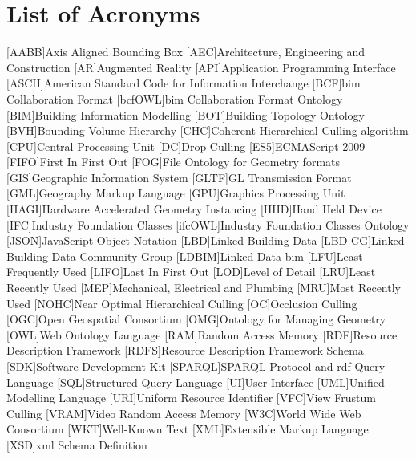 \documentclass[12pt,a4paper,faculty=ea,language=en,doctype=report]{settings/ugent-doc}
\begin{document}
\chapter*{List of Acronyms}
\begin{acronym}[JSONP]\itemsep2pt\hypersetup{hidelinks}
  [AABB]{Axis Aligned Bounding Box}
  [AEC]{Architecture, Engineering and Construction}
  [AR]{Augmented Reality}
  [API]{Application Programming Interface}
  [ASCII]{American Standard Code for Information Interchange}
  [BCF]{\acs{bim} Collaboration Format}
  [bcfOWL]{\acs{bim} Collaboration Format Ontology}
  [BIM]{Building Information Modelling}
  [BOT]{Building Topology Ontology}
  [BVH]{Bounding Volume Hierarchy}
  [CHC]{Coherent Hierarchical Culling algorithm}
  [CPU]{Central Processing Unit}
  [DC]{Drop Culling}
  [ES5]{ECMAScript 2009}
  [FIFO]{First In First Out}
  [FOG]{File Ontology for Geometry formats}
  [GIS]{Geographic Information System}
  [GLTF]{GL Transmission Format}
  [GML]{Geography Markup Language}
  [GPU]{Graphics Processing Unit}
  [HAGI]{Hardware Accelerated Geometry Instancing}
  [HHD]{Hand Held Device}
  [IFC]{Industry Foundation Classes}
  [ifcOWL]{Industry Foundation Classes Ontology}
  [JSON]{JavaScript Object Notation}
  [LBD]{Linked Building Data}
  [LBD-CG]{Linked Building Data Community Group}
  [LDBIM]{Linked Data \acs{bim}}
  [LFU]{Least Frequently Used}
  [LIFO]{Last In First Out}
  [LOD]{Level of Detail}
  [LRU]{Least Recently Used}
  [MEP]{Mechanical, Electrical and Plumbing}
  [MRU]{Most Recently Used}
  [NOHC]{Near Optimal Hierarchical Culling}
  [OC]{Occlusion Culling}
  [OGC]{Open Geospatial Consortium}
  [OMG]{Ontology for Managing Geometry}
  [OWL]{Web Ontology Language}
  [RAM]{Random Access Memory}
  [RDF]{Resource Description Framework}
  [RDFS]{Resource Description Framework Schema}
  [SDK]{Software Development Kit}
  [SPARQL]{SPARQL Protocol and \acs{rdf} Query Language}
  [SQL]{Structured Query Language}
  [UI]{User Interface}
  [UML]{Unified Modelling Language}
  [URI]{Uniform Resource Identifier}
  [VFC]{View Frustum Culling}
  [VRAM]{Video Random Access Memory}
  [W3C]{World Wide Web Consortium}
  [WKT]{Well-Known Text}
  [XML]{Extensible Markup Language}
  [XSD]{\ac{xml} Schema Definition}
\end{acronym}

\printbibliography[nottype=web_page, heading=bibintoc,title={References}]
\printbibliography[type=web_page, heading=bibintoc, title={Referenced websites}]
\restoregeometry

\appendix


\end{document}
